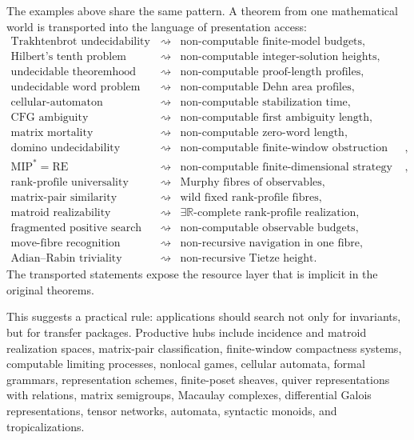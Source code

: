 \documentclass[11pt]{article}
\begin{document}
The examples above share the same pattern. A theorem from one mathematical world is transported into the language of presentation access:
\[
\begin{array}{ccl}
\text{Trakhtenbrot undecidability} &\rightsquigarrow&
\text{non-computable finite-model budgets},\\[2mm]
\text{Hilbert's tenth problem} &\rightsquigarrow&
\text{non-computable integer-solution heights},\\[2mm]
\text{undecidable theoremhood} &\rightsquigarrow&
\text{non-computable proof-length profiles},\\[2mm]
\text{undecidable word problem} &\rightsquigarrow&
\text{non-computable Dehn area profiles},\\[2mm]
\text{cellular-automaton nilpotency} &\rightsquigarrow&
\text{non-computable stabilization time},\\[2mm]
\text{CFG ambiguity undecidability} &\rightsquigarrow&
\text{non-computable first ambiguity length},\\[2mm]
\text{matrix mortality undecidability} &\rightsquigarrow&
\text{non-computable zero-word length},\\[2mm]
\text{domino undecidability} &\rightsquigarrow&
\text{non-computable finite-window obstruction radius},\\[2mm]
\mathrm{MIP}^{\ast}=\mathrm{RE} &\rightsquigarrow&
\text{non-computable finite-dimensional strategy budgets},\\[2mm]
\text{rank-profile universality} &\rightsquigarrow&
\text{Murphy fibres of observables},\\[2mm]
\text{matrix-pair similarity} &\rightsquigarrow&
\text{wild fixed rank-profile fibres},\\[2mm]
\text{matroid realizability} &\rightsquigarrow&
\exists\mathbb R\text{-complete rank-profile realization},\\[2mm]
\text{fragmented positive search} &\rightsquigarrow&
\text{non-computable observable budgets},\\[2mm]
\text{move-fibre recognition} &\rightsquigarrow&
\text{non-recursive navigation in one fibre},\\[2mm]
\text{Adian--Rabin triviality} &\rightsquigarrow&
\text{non-recursive Tietze height}.
\end{array}
\]
The transported statements expose the resource layer that is implicit in the original theorems.

This suggests a practical rule: applications should search not only for invariants, but for transfer packages. Productive hubs include incidence and matroid realization spaces, matrix-pair classification, finite-window compactness systems, computable limiting processes, nonlocal games, cellular automata, formal grammars, representation schemes, finite-poset sheaves, quiver representations with relations, matrix semigroups, Macaulay complexes, differential Galois representations, tensor networks, automata, syntactic monoids, and tropicalizations.
\end{document}
